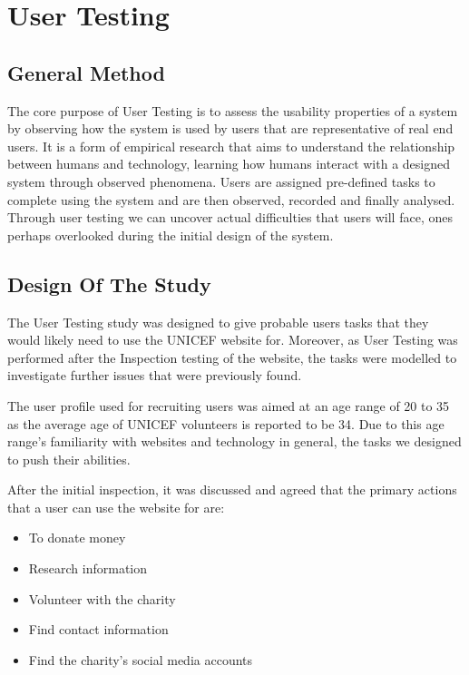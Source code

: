 \section{User Testing}

\subsection{General Method}
The core purpose of User Testing is to assess the usability properties of a system by observing how the system is used by users that are representative of real end users. It is a form of empirical research that aims to understand the relationship between humans and technology, learning how humans interact with a designed system through observed phenomena. 
Users are assigned pre-defined tasks to complete using the system and are then observed, recorded and finally analysed. 
Through user testing we can uncover actual difficulties that users will face, ones perhaps overlooked during the initial design of the system.

\subsection{Design Of The Study}
The User Testing study was designed to give probable users tasks that they would likely need to use the UNICEF website for. Moreover, as User Testing was performed after the Inspection testing of the website, the tasks were modelled to investigate further issues that were previously found. 

The user profile used for recruiting users was aimed at an age range of 20 to 35 as the average age of UNICEF volunteers is reported to be 34. Due to this age range’s familiarity with websites and technology in general, the tasks we designed to push their abilities.

After the initial inspection, it was discussed and agreed that the primary actions that a user can use the website for are:
\begin{itemize}
    \item To donate money 
    \item Research information
    \item Volunteer with the charity
    \item Find contact information
    \item Find the charity’s social media accounts
  \end{itemize}


